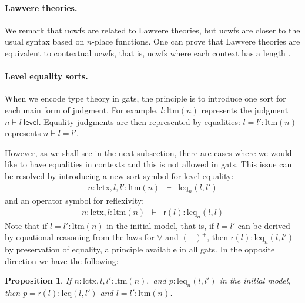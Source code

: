 \documentclass[11pt,a4paper]{article}
\theoremstyle{plain}
\newtheorem*{proposition*}{Proposition}%
\theoremstyle{definition}
\newcommand{\level}{\mathsf{level}}
\newcommand{\refl}{\mathsf{r}}
\def\lctx{\mathrm{lctx}}
\def\ltm{\mathrm{ltm}}
\def\leq{\mathrm{leq}}
\begin{document}
\paragraph{Lawvere theories.} We remark that ucwfs are related to Lawvere theories, but ucwfs are closer to the usual syntax based on $n$-place functions. One can prove that Lawvere theories are equivalent to contextual ucwfs, that is, ucwfs where each context has a length \cite{ClairambaultD11,castellan:lambek}.

\paragraph{Level equality sorts.}
When we encode type theory in gats, the principle is to introduce one sort for each main form of judgment. For example, $l : \ltm(n)$ represents the judgment $n \vdash l\ \level$. Equality judgments are then represented by equalities: $l = l' : \ltm(n)$ represents $n \vdash l = l'$.

However, as we shall see in the next subsection, there are cases where we would like to have equalities in contexts and this is not allowed in gats. This issue can be resolved by introducing a new sort symbol for level equality:
\begin{eqnarray*}
n : \lctx, l, l'  : \ltm(n) &\vdash& \leq_n(l,l')
\end{eqnarray*}
and an operator symbol for reflexivity:
\begin{eqnarray*}
n : \lctx, l : \ltm(n) &\vdash& \refl(l) :  \leq_n(l,l)
\end{eqnarray*}
Note that if $l =  l' : \ltm(n)$ in the initial model, that is, if $l = l'$ can be derived by equational reasoning from the laws for $\vee$ and $(-)^+$, then $\refl(l) :  \leq_n(l,l')$
by preservation of equality, a principle available in all gats. In the opposite direction we have the following:
\begin{proposition*}
If $n : \lctx, l, l' : \ltm(n),$ and $p :  \leq_n(l,l')$ in the initial model,
then $p = \refl(l) : \leq(l,l')$ and $l = l' : \ltm(n)$.
\end{proposition*}
\end{document}
